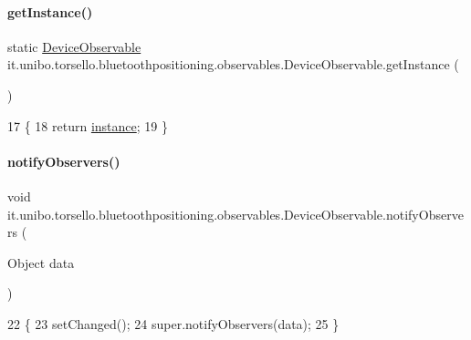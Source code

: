 \paragraph{\texorpdfstring{get\+Instance()}{getInstance()}}
{\footnotesize\ttfamily static \hyperlink{classit_1_1unibo_1_1torsello_1_1bluetoothpositioning_1_1observables_1_1DeviceObservable}{Device\+Observable} it.\+unibo.\+torsello.\+bluetoothpositioning.\+observables.\+Device\+Observable.\+get\+Instance (\begin{DoxyParamCaption}{ }\end{DoxyParamCaption})\hspace{0.3cm}{\ttfamily [static]}}


\begin{DoxyCode}
17                                                  \{
18         \textcolor{keywordflow}{return} \hyperlink{classit_1_1unibo_1_1torsello_1_1bluetoothpositioning_1_1observables_1_1DeviceObservable_a43120f0ae1d6ae6c543219ec42df15e2_a43120f0ae1d6ae6c543219ec42df15e2}{instance};
19     \}
\end{DoxyCode}
\hypertarget{classit_1_1unibo_1_1torsello_1_1bluetoothpositioning_1_1observables_1_1DeviceObservable_aaf183e537e44cbd114c8eb76432da191_aaf183e537e44cbd114c8eb76432da191}{}\label{classit_1_1unibo_1_1torsello_1_1bluetoothpositioning_1_1observables_1_1DeviceObservable_aaf183e537e44cbd114c8eb76432da191_aaf183e537e44cbd114c8eb76432da191} 
\paragraph{\texorpdfstring{notify\+Observers()}{notifyObservers()}}
{\footnotesize\ttfamily void it.\+unibo.\+torsello.\+bluetoothpositioning.\+observables.\+Device\+Observable.\+notify\+Observers (\begin{DoxyParamCaption}\item[{Object}]{data }\end{DoxyParamCaption})}


\begin{DoxyCode}
22                                              \{
23         setChanged();
24         super.notifyObservers(data);
25     \}
\end{DoxyCode}


